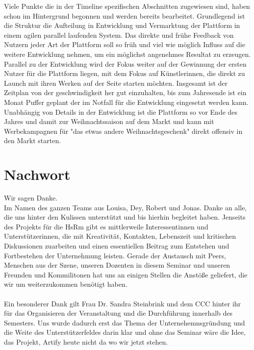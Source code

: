\documentclass[11pt,a4paper]{report}
\begin{document}
Viele Punkte die in der Timeline spezifischen Abschnitten zugewiesen sind, haben schon im Hintergrund begonnen und werden bereits bearbeitet. Grundlegend ist die Struktur die Aufteilung in Entwicklung und Vermarktung der Plattform in einem agilen parallel laufenden System. Das direkte und frühe Feedback von Nutzern jeder Art der Plattform soll so früh und viel wie möglich Influss auf die weitere Entwicklung nehmen, um ein möglichst angenehmes Resultat zu erzeugen.\\
Parallel zu der Entwicklung wird der Fokus weiter auf der Gewinnung der ersten Nutzer für die Plattform liegen, mit dem Fokus auf Künstlerinnen, die direkt zu Launch mit ihren Werken auf der Seite starten möchten. Insgesamt ist der Zeitplan von der geschwindigkeit her gut einzuhalten, bis zum Jahresende ist ein Monat Puffer geplant der im Notfall für die Entwicklung eingesetzt werden kann. Unabhängig von Details in der Entwicklung ist die Plattform so vor Ende des Jahres und damit zur Weihnachtssaison auf dem Markt und kann mit Werbekampagnen für "das etwas andere Weihnachtsgeschenk" direkt offensiv in den Markt starten.

\chapter*{Nachwort}
\Large{Wir sagen Danke.}\\
\normalsize Im Namen des ganzen Teams aus Louisa, Dey, Robert und Jonas. Danke an alle, die uns hinter den Kulissen unterstützt und bis hierhin begleitet haben. Jenseits des Projekts für die HsRm gibt es mittlerweile Interessentinnen und Unterstützerinnen, die mit Kreativität, Kontakten, Lebenszeit und kritischen Diskussionen zuarbeiten und einen essentiellen Beitrag zum Entstehen und Fortbestehen der Unternehmung leisten. Gerade der Austausch mit Peers, Menschen aus der Szene, unseren Dozenten in diesem Seminar und unseren Freunden und Kommilitonen hat uns an einigen Stellen die Anstöße geliefert, die wir um weiterzukommen benötigt haben.\\
\\Ein besonderer Dank gilt Frau Dr. Sandra Steinbrink und dem CCC hinter ihr für das Organisieren der Veranstaltung und die Durchführung innerhalb des Semesters. Uns wurde dadurch erst das Thema der Unternehemnsgründung und die Weite des Unterstützerfeldes darin klar und ohne das Seminar wäre die Idee, das Projekt, Artify heute nicht da wo wir jetzt stehen.
\end{document}

